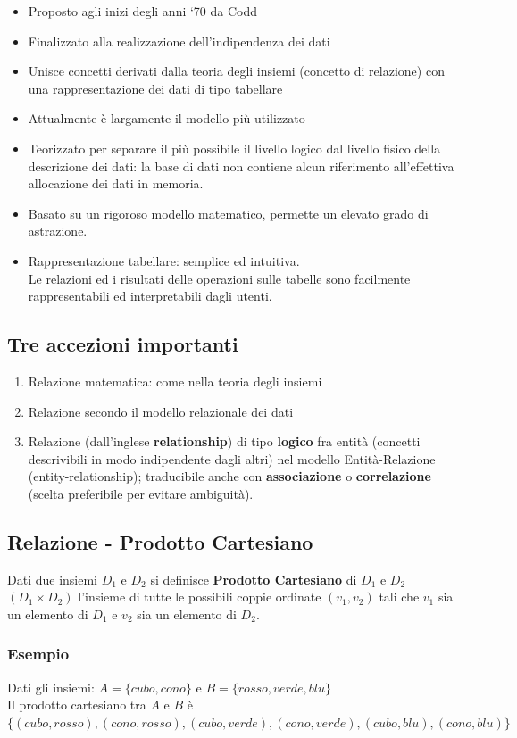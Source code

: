 \documentclass[../main.tex]{subfiles}
\begin{document}
		\begin{itemize}
		\item Proposto agli inizi degli anni ‘70 da Codd
		\item Finalizzato alla realizzazione dell’indipendenza dei dati
		\item Unisce concetti derivati dalla teoria degli insiemi (concetto di relazione) con una rappresentazione dei dati di tipo tabellare
		\item Attualmente è largamente il modello più utilizzato
		\item Teorizzato per separare il più possibile il livello logico dal livello fisico della descrizione dei dati: la base di dati non contiene alcun riferimento all’effettiva allocazione dei dati in memoria.
		\item Basato su un rigoroso modello matematico, permette un elevato grado di astrazione.
		\item Rappresentazione tabellare: semplice ed intuitiva.\\Le relazioni ed i risultati delle operazioni sulle tabelle sono facilmente rappresentabili ed interpretabili dagli utenti.
	\end{itemize}
	\subsection{Tre accezioni importanti}
	\begin{enumerate}
		\item Relazione matematica: come nella teoria degli insiemi
		\item Relazione secondo il modello relazionale dei dati
		\item Relazione (dall’inglese \textbf{relationship}) di tipo \textbf{logico} fra entità (concetti descrivibili in modo indipendente dagli altri) nel modello Entità-Relazione (entity-relationship); traducibile anche con \textbf{associazione} o \textbf{correlazione} (scelta preferibile per evitare ambiguità).
	\end{enumerate}
	\subsection{Relazione - Prodotto Cartesiano}
	Dati due insiemi $D_1$ e $D_2$ si definisce \textbf{Prodotto Cartesiano} di $D_1$ e $D_2$ \ $(D_1 \times D_2)$ l’insieme di tutte le possibili coppie ordinate $(v_1, v_2)$ tali che $v_1$ sia un elemento di $D_1$ e $v_2$ sia un elemento di $D_2$.
	\subsubsection{Esempio}
	Dati gli insiemi: $A = \{cubo, cono\}$ e $B = \{rosso, verde, blu\}$\\
	Il prodotto cartesiano tra $A$ e $B$ è $\{(cubo, rosso), (cono, rosso), (cubo, verde), (cono, verde), (cubo, blu), (cono, blu)\}$
\end{document}
